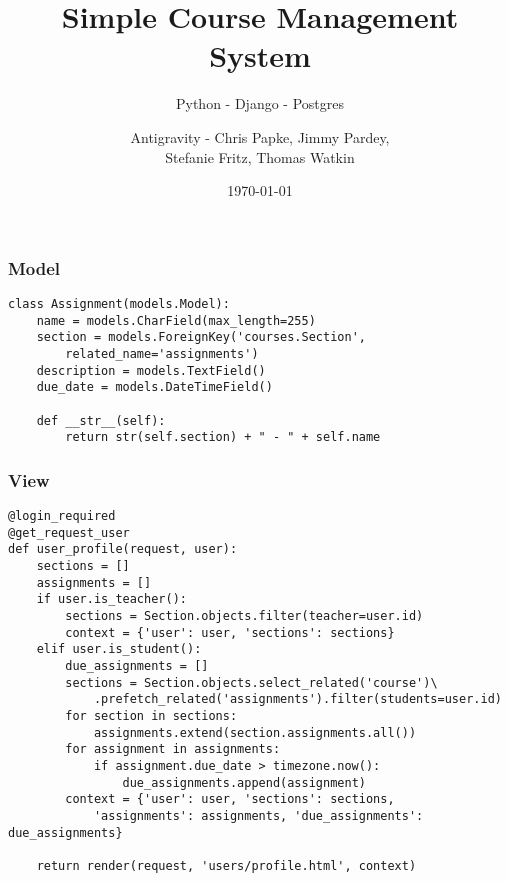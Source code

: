 \documentclass{beamer}
\begin{document}
\title[Group Project]{Simple Course Management System}
\subtitle{Python - Django - Postgres}
\author{Antigravity - Chris Papke, Jimmy Pardey, \\Stefanie Fritz, Thomas Watkin}
\date{\today}

\begin{frame}[plain]
\titlepage
\end{frame}

\begin{frame}[fragile]
\frametitle{Model}

\begin{lstlisting}[basicstyle=\small]
class Assignment(models.Model):
    name = models.CharField(max_length=255)
    section = models.ForeignKey('courses.Section', 
        related_name='assignments')
    description = models.TextField()
    due_date = models.DateTimeField()

    def __str__(self):
        return str(self.section) + " - " + self.name
\end{lstlisting}
\end{frame}

\begin{frame}[fragile]
\frametitle{View}

\begin{lstlisting}[basicstyle=\tiny]
@login_required
@get_request_user
def user_profile(request, user):
    sections = []
    assignments = []
    if user.is_teacher():
        sections = Section.objects.filter(teacher=user.id)
        context = {'user': user, 'sections': sections}
    elif user.is_student():
        due_assignments = []
        sections = Section.objects.select_related('course')\
            .prefetch_related('assignments').filter(students=user.id)
        for section in sections:
            assignments.extend(section.assignments.all())
        for assignment in assignments:
            if assignment.due_date > timezone.now():
                due_assignments.append(assignment)
        context = {'user': user, 'sections': sections, 
            'assignments': assignments, 'due_assignments': due_assignments}

    return render(request, 'users/profile.html', context)  
\end{lstlisting}
\end{frame}


\end{document}
